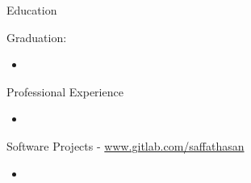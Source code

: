 \documentclass[]{mcdowellcv}
\begin{document}
	\makeheader
	
	\begin{cvsection}{Education}
		\begin{cvsubsection}{}{}{Graduation: }
			\begin{itemize}
				\item {}
			\end{itemize}
		\end{cvsubsection}
	\end{cvsection}

	\begin{cvsection}{Professional Experience}
		\begin{cvsubsection}{}{}{}
			\begin{itemize}
				\item {}
			\end{itemize}
	    \end{cvsubsection}
	
	\begin{cvsection}{Software Projects - \url{www.gitlab.com/saffathasan}}
		\begin{cvsubsection}{}{}{}
			\begin{itemize}
				\item {}
			\end{itemize}
	    \end{cvsubsection}
	\end{cvsection}

	

\end{cvsection}
\end{document}
